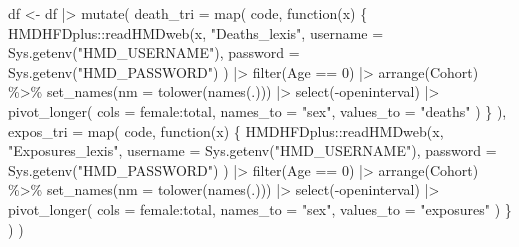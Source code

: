 \documentclass[
  letterpaper,
  DIV=11,
  numbers=noendperiod]{scrartcl}
\newenvironment{Shaded}{\begin{snugshade}}{\end{snugshade}}
\newcommand{\AttributeTok}[1]{\textcolor[rgb]{0.40,0.45,0.13}{#1}}
\newcommand{\ControlFlowTok}[1]{\textcolor[rgb]{0.00,0.23,0.31}{#1}}
\newcommand{\DecValTok}[1]{\textcolor[rgb]{0.68,0.00,0.00}{#1}}
\newcommand{\FunctionTok}[1]{\textcolor[rgb]{0.28,0.35,0.67}{#1}}
\newcommand{\NormalTok}[1]{\textcolor[rgb]{0.00,0.23,0.31}{#1}}
\newcommand{\OtherTok}[1]{\textcolor[rgb]{0.00,0.23,0.31}{#1}}
\newcommand{\SpecialCharTok}[1]{\textcolor[rgb]{0.37,0.37,0.37}{#1}}
\newcommand{\StringTok}[1]{\textcolor[rgb]{0.13,0.47,0.30}{#1}}
\begin{document}
\begin{Shaded}
\begin{Highlighting}[]
\NormalTok{df }\OtherTok{\textless{}{-}}\NormalTok{ df }\SpecialCharTok{|\textgreater{}} 
  \FunctionTok{mutate}\NormalTok{(}
    \AttributeTok{death\_tri =} \FunctionTok{map}\NormalTok{(}
\NormalTok{      code, }
      \ControlFlowTok{function}\NormalTok{(x) \{}
\NormalTok{      HMDHFDplus}\SpecialCharTok{::}\FunctionTok{readHMDweb}\NormalTok{(x, }\StringTok{"Deaths\_lexis"}\NormalTok{, }
         \AttributeTok{username =} \FunctionTok{Sys.getenv}\NormalTok{(}\StringTok{"HMD\_USERNAME"}\NormalTok{), }
         \AttributeTok{password =} \FunctionTok{Sys.getenv}\NormalTok{(}\StringTok{"HMD\_PASSWORD"}\NormalTok{)}
\NormalTok{      ) }\SpecialCharTok{|\textgreater{}} 
          \FunctionTok{filter}\NormalTok{(Age }\SpecialCharTok{==} \DecValTok{0}\NormalTok{) }\SpecialCharTok{|\textgreater{}} 
          \FunctionTok{arrange}\NormalTok{(Cohort) }\SpecialCharTok{\%\textgreater{}\%} 
          \FunctionTok{set\_names}\NormalTok{(}\AttributeTok{nm =} \FunctionTok{tolower}\NormalTok{(}\FunctionTok{names}\NormalTok{(.))) }\SpecialCharTok{|\textgreater{}} 
          \FunctionTok{select}\NormalTok{(}\SpecialCharTok{{-}}\NormalTok{openinterval) }\SpecialCharTok{|\textgreater{}} 
          \FunctionTok{pivot\_longer}\NormalTok{(}
            \AttributeTok{cols =}\NormalTok{ female}\SpecialCharTok{:}\NormalTok{total, }
            \AttributeTok{names\_to =} \StringTok{"sex"}\NormalTok{, }
            \AttributeTok{values\_to  =} \StringTok{"deaths"}
\NormalTok{          )    }
\NormalTok{      \}}
\NormalTok{    ),}
    \AttributeTok{expos\_tri =} \FunctionTok{map}\NormalTok{(}
\NormalTok{      code, }
      \ControlFlowTok{function}\NormalTok{(x) \{}
\NormalTok{      HMDHFDplus}\SpecialCharTok{::}\FunctionTok{readHMDweb}\NormalTok{(x, }\StringTok{"Exposures\_lexis"}\NormalTok{,}
         \AttributeTok{username =} \FunctionTok{Sys.getenv}\NormalTok{(}\StringTok{"HMD\_USERNAME"}\NormalTok{),}
         \AttributeTok{password =} \FunctionTok{Sys.getenv}\NormalTok{(}\StringTok{"HMD\_PASSWORD"}\NormalTok{)}
\NormalTok{     ) }\SpecialCharTok{|\textgreater{}} 
          \FunctionTok{filter}\NormalTok{(Age }\SpecialCharTok{==} \DecValTok{0}\NormalTok{) }\SpecialCharTok{|\textgreater{}} 
          \FunctionTok{arrange}\NormalTok{(Cohort) }\SpecialCharTok{\%\textgreater{}\%} 
          \FunctionTok{set\_names}\NormalTok{(}\AttributeTok{nm =} \FunctionTok{tolower}\NormalTok{(}\FunctionTok{names}\NormalTok{(.))) }\SpecialCharTok{|\textgreater{}} 
          \FunctionTok{select}\NormalTok{(}\SpecialCharTok{{-}}\NormalTok{openinterval) }\SpecialCharTok{|\textgreater{}} 
          \FunctionTok{pivot\_longer}\NormalTok{(}
            \AttributeTok{cols =}\NormalTok{ female}\SpecialCharTok{:}\NormalTok{total, }
            \AttributeTok{names\_to =} \StringTok{"sex"}\NormalTok{, }
            \AttributeTok{values\_to  =} \StringTok{"exposures"}
\NormalTok{          )         }
\NormalTok{    \}}
\NormalTok{    )}
\NormalTok{  )}


\end{Highlighting}
\end{Shaded}
\end{document}
